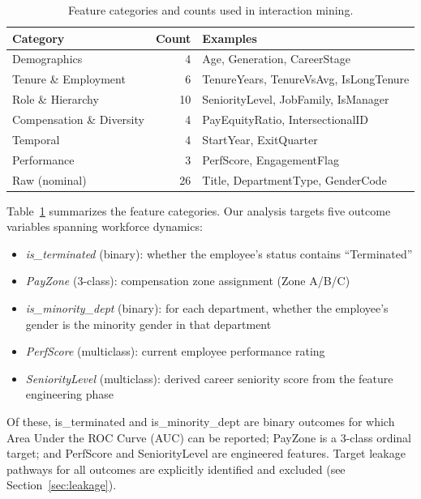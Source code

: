 \documentclass[conference]{IEEEtran}
\begin{document}
\begin{table}[htb]
\centering
\footnotesize
\renewcommand{\arraystretch}{1.15}
\caption{Feature categories and counts used in interaction mining.}
\label{tab:features}
\begin{tabular}{lrp{2.8cm}}
\hline
Category & Count & Examples \\
\hline
Demographics & 4 & Age, Generation, CareerStage \\
Tenure \& Employment & 6 & TenureYears, TenureVsAvg, IsLongTenure \\
Role \& Hierarchy & 10 & SeniorityLevel, JobFamily, IsManager \\
Compensation \& Diversity & 4 & PayEquityRatio, IntersectionalID \\
Temporal & 4 & StartYear, ExitQuarter \\
Performance & 3 & PerfScore, EngagementFlag \\
Raw (nominal) & 26 & Title, DepartmentType, GenderCode \\
\hline
\end{tabular}
\end{table}

Table~\ref{tab:features} summarizes the feature categories. Our analysis targets five outcome variables spanning workforce dynamics:

\begin{itemize}
    \item \textit{is\_terminated} (binary): whether the employee's status contains ``Terminated''
    \item \textit{PayZone} (3-class): compensation zone assignment (Zone A/B/C)
    \item \textit{is\_minority\_dept} (binary): for each department, whether the employee's gender is the minority gender in that department
    \item \textit{PerfScore} (multiclass): current employee performance rating
    \item \textit{SeniorityLevel} (multiclass): derived career seniority score from the feature engineering phase
\end{itemize}

Of these, is\_terminated and is\_minority\_dept are binary outcomes for which Area Under the ROC Curve (AUC) can be reported; PayZone is a 3-class ordinal target; and PerfScore and SeniorityLevel are engineered features. Target leakage pathways for all outcomes are explicitly identified and excluded (see Section~\ref{sec:leakage}).
\end{document}
